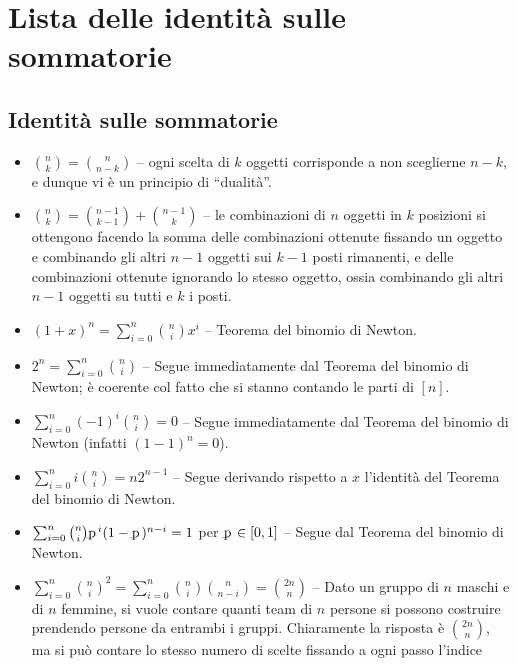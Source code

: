 \chapter*{Lista delle identità sulle sommatorie}
\setlength{\parindent}{2pt}

\section*{Identità sulle sommatorie}

\begin{itemize}
    \item $\binom{n}{k} = \binom{n}{n-k}$ -- ogni scelta di $k$ oggetti corrisponde
    a non sceglierne $n-k$, e dunque vi è un principio di ``dualità''.
    \item $\binom{n}{k} = \binom{n-1}{k-1} + \binom{n-1}{k}$ -- le combinazioni
    di $n$ oggetti in $k$ posizioni si ottengono facendo la somma delle combinazioni
    ottenute fissando un oggetto e combinando gli altri $n-1$ oggetti sui $k-1$
    posti rimanenti, e delle combinazioni ottenute ignorando lo stesso oggetto,
    ossia combinando gli altri $n-1$ oggetti su tutti e $k$ i posti.
    \item $(1 + x)^n = \sum_{i = 0}^n \binom{n}{i} x^i$ -- Teorema del binomio di Newton.
    \item $2^n = \sum_{i = 0}^n \binom{n}{i}$ -- Segue immediatamente dal Teorema del binomio di Newton; è coerente col fatto che si stanno contando le parti di $[n]$.
    \item $\sum_{i = 0}^n (-1)^i \binom{n}{i} = 0$ -- Segue immediatamente dal Teorema del binomio
    di Newton (infatti $(1-1)^n = 0$).
    \item $\sum_{i = 0}^n i \binom{n}{i} = n 2^{n-1}$ -- Segue derivando rispetto a $x$ l'identità
    del Teorema del binomio di Newton.
    \item $\sum_{i = 0}^n \binom{n}{i} \pp^i (1 - \pp)^{n-i} = 1$ per $\pp \in [0, 1]$ -- Segue dal Teorema del binomio di Newton.
    \item $\sum_{i=0}^n \binom{n}{i}^2 = \sum_{i=0}^n \binom{n}{i} \binom{n}{n-i} = \binom{2n}{n}$ -- Dato un gruppo di $n$ maschi e di $n$ femmine, si vuole
    contare quanti team di $n$ persone si possono costruire prendendo persone
    da entrambi i gruppi. Chiaramente la risposta è $\binom{2n}{n}$, ma si
    può contare lo stesso numero di scelte fissando a ogni passo l'indice

\end{itemize}
